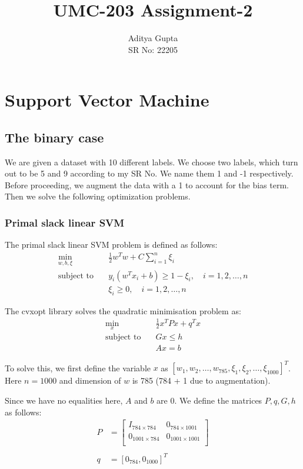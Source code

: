 \documentclass[12pt]{article}
\title{\vspace{-1.5cm}UMC-203 Assignment-2}
\author{Aditya Gupta \\
SR No: 22205}
\date{}
\begin{document}
\maketitle

\section{Support Vector Machine}

\subsection{The binary case}
We are given a dataset with 10 different labels. We choose two labels, which turn out to be 5 and 9 according to my SR No. We name them 1 and -1 respectively. Before proceeding, we augment the data with a 1 to account for the bias term. Then we solve the following optimization problems.

\subsubsection{Primal slack linear SVM}
The primal slack linear SVM problem is defined as follows:
\begin{align*}
    \min_{w, b, \xi} \quad &\frac{1}{2}w^Tw + C\sum_{i=1}^{n}\xi_i \\
    \text{subject to} \quad &y_i(w^Tx_i + b) \geq 1 - \xi_i, \quad i = 1, 2, \ldots, n \\
    &\xi_i \geq 0, \quad i = 1, 2, \ldots, n
\end{align*}

The cvxopt library solves the quadratic minimisation problem as:
\begin{align*}
    \min_{x} \quad &\frac{1}{2}x^TPx + q^Tx \\
    \text{subject to} \quad &Gx \leq h \\
    &Ax = b
\end{align*}

To solve this, we first define the variable $x$ as $[w_1, w_2, \dots ,w_{785}, \xi_1, \xi_2, \dots ,\xi_{1000}]^T$. Here $n=1000$ and dimension of $w$ is 785 (784 + 1 due to augmentation).

Since we have no equalities here, $A$ and $b$ are 0. We define the matrices $P, q, G, h$ as follows:
\begin{align*}
    P &= \begin{bmatrix}
        I_{784 \times 784} & 0_{784 \times 1001} \\
        0_{1001 \times 784} & 0_{1001 \times 1001} \\
    \end{bmatrix} \\ \\
    q &= [0_{784}, 0_{1000}]^T \\ \\
\end{align*}
\end{document}
